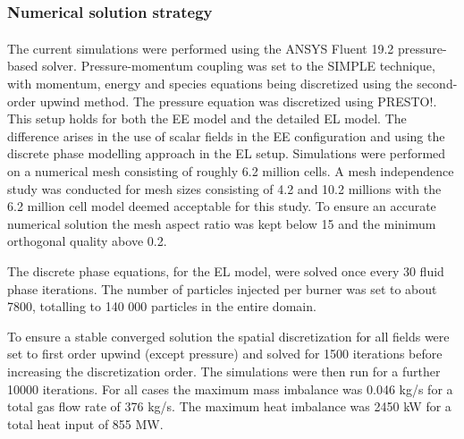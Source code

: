 \documentclass{webofc}
\begin{document}
\subsubsection{Numerical solution strategy}
The current simulations were performed using the ANSYS Fluent\textsuperscript{\textregistered} 19.2 pressure-based solver. Pressure-momentum coupling was set to the SIMPLE technique, with momentum, energy and species equations being discretized using the second-order upwind method. The pressure equation was discretized using PRESTO!. This setup holds for both the EE model and the detailed EL model. The difference arises in the use of scalar fields in the EE configuration and using the discrete phase modelling approach in the EL setup. Simulations were performed on a numerical mesh consisting of roughly 6.2 million cells. A mesh independence study was conducted for mesh sizes consisting of 4.2 and 10.2 millions with the 6.2 million cell model deemed acceptable for this study. To ensure an accurate numerical solution the mesh aspect ratio was kept below 15 and the minimum orthogonal quality above 0.2.

The discrete phase equations, for the EL model, were solved once every 30 fluid phase iterations. The number of particles injected per burner was set to about 7800, totalling to 140 000 particles in the entire domain.

To ensure a stable converged solution the spatial discretization for all fields were set to first order upwind (except pressure) and solved for 1500 iterations before increasing the discretization order. The simulations were then run for a further 10000 iterations. For all cases the maximum mass imbalance was 0.046 kg/s for a total gas flow rate of 376 kg/s. The maximum heat imbalance was 2450 kW for a total heat input of 855 MW.
\end{document}
